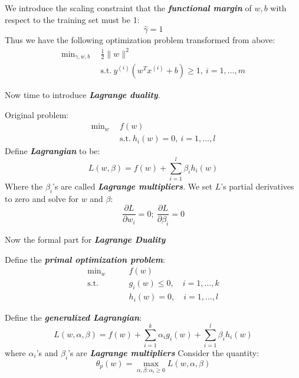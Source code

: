 \documentclass{article}
\begin{document}
We introduce the scaling constraint that the \emph{\textbf{functional margin}} of $w,b$ with respect to the training set must be 1:
\begin{equation*}
\hat{\gamma}=1
\end{equation*}
Thus we have the following optimization problem transformed from above:
\begin{align*}
\min\nolimits_{\gamma,w,b}\ &\ \frac{1}{2}\lVert w\rVert^2 \\
                  &\ \text{s.t.}\  y^{(i)}(w^Tx^{(i)}+b)\geq1,\ i=1,\ldots,m
\end{align*}

Now time to introduce \emph{\textbf{Lagrange duality}}.

Original problem:
\begin{align*}
\min\nolimits_w\ &\ f(w) \\
                 &\ \text{s.t.}\ h_i(w)=0,\ i=1,\ldots,l
\end{align*}
Define \emph{\textbf{Lagrangian}} to be:
\begin{equation*}
L(w,\beta)=f(w)+\sum_{i=1}^l\beta_ih_i(w)
\end{equation*}
Where the $\beta_i$'s are called \emph{\textbf{Lagrange multipliers}}.
We set $L$'s partial derivatives to zero and solve for $w$ and $\beta$:
\begin{equation*}
\frac{\partial L}{\partial w_i}=0;\ \frac{\partial L}{\partial \beta_i}=0
\end{equation*}

Now the formal part for \emph{\textbf{Lagrange Duality}}

Define the \emph{\textbf{primal optimization problem}}:
\begin{align*}
\min\nolimits_w\quad\quad &f(w) \\
\text{s.t.}\quad &g_i(w)\leq0,\quad i=1,\ldots,k \\
                 &h_i(w)=0,\quad i=1,\ldots,l
\end{align*}

Define the \emph{\textbf{generalized Lagrangian}}:
\begin{equation*}
L(w,\alpha,\beta)=f(w)+\sum_{i=1}^{k}\alpha_ig_i(w)+\sum_{i=1}^l\beta_ih_i(w)
\end{equation*}
where $\alpha_i$'s and $\beta_i$'s are \emph{\textbf{Lagrange multipliers}}
Consider the quantity:
\begin{equation*}
\theta_p(w)=\max_{\alpha,\beta:\alpha_i\geq0}L(w,\alpha,\beta)
\end{equation*}
\end{document}
